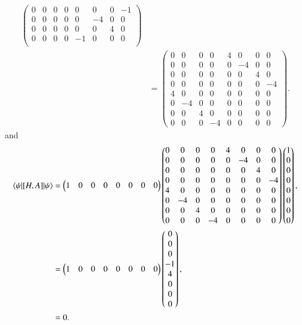 \begin{align*}
\begin{pmatrix}
0 & 0 & 0 & 0 & 0 & 0 & 0 & -1  \\
0 & 0 & 0 & 0 & 0 & -4 & 0 & 0  \\
0 & 0 & 0 & 0 & 0 & 0 & 4 & 0  \\
0 & 0 & 0 & 0 & -1 & 0 & 0 & 0  \\
\end{pmatrix} \\
	&= \begin{pmatrix} 
	0 & 0 & 0 & 0 & 4 & 0 & 0 & 0  \\
	0 & 0 & 0 & 0 & 0 & -4 & 0 & 0  \\
	0 & 0 & 0 & 0 & 0 & 0 & 4 & 0  \\
	0 & 0 & 0 & 0 & 0 & 0 & 0 & -4  \\
	4 & 0 & 0 & 0 & 0 & 0 & 0 & 0  \\
	0 & -4 & 0 & 0 & 0 & 0 & 0 & 0  \\
	0 & 0 & 4 & 0 & 0 & 0 & 0 & 0  \\
	0 & 0 & 0 & -4 & 0 & 0 & 0 & 0 
	\end{pmatrix}.
\end{align*}
and 
\begin{align}
	\label{eq:zerograd}
	\braket{\psi|[H,A]|\psi} &= 
	\begin{pmatrix} 1 & 0 & 0 & 0 & 0 & 0 & 0 & 0  \end{pmatrix} 
	\begin{pmatrix} 
	0 & 0 & 0 & 0 & 4 & 0 & 0 & 0  \\
	0 & 0 & 0 & 0 & 0 & -4 & 0 & 0  \\
	0 & 0 & 0 & 0 & 0 & 0 & 4 & 0  \\
	0 & 0 & 0 & 0 & 0 & 0 & 0 & -4  \\
	4 & 0 & 0 & 0 & 0 & 0 & 0 & 0  \\
	0 & -4 & 0 & 0 & 0 & 0 & 0 & 0  \\
	0 & 0 & 4 & 0 & 0 & 0 & 0 & 0  \\
	0 & 0 & 0 & -4 & 0 & 0 & 0 & 0 
	\end{pmatrix}
	\begin{pmatrix} 1 \\ 0 \\ 0 \\ 0 \\ 0 \\ 0 \\ 0 \\ 0 \end{pmatrix}, \\
	&= \begin{pmatrix} 1 & 0 & 0 & 0 & 0 & 0 & 0 & 0 \end{pmatrix} 
	\begin{pmatrix} 0 \\ 0 \\ 0 \\ -1 \\ 4 \\ 0 \\ 0 \\ 0 \end{pmatrix}, \\
		&= 0.
\end{align}

